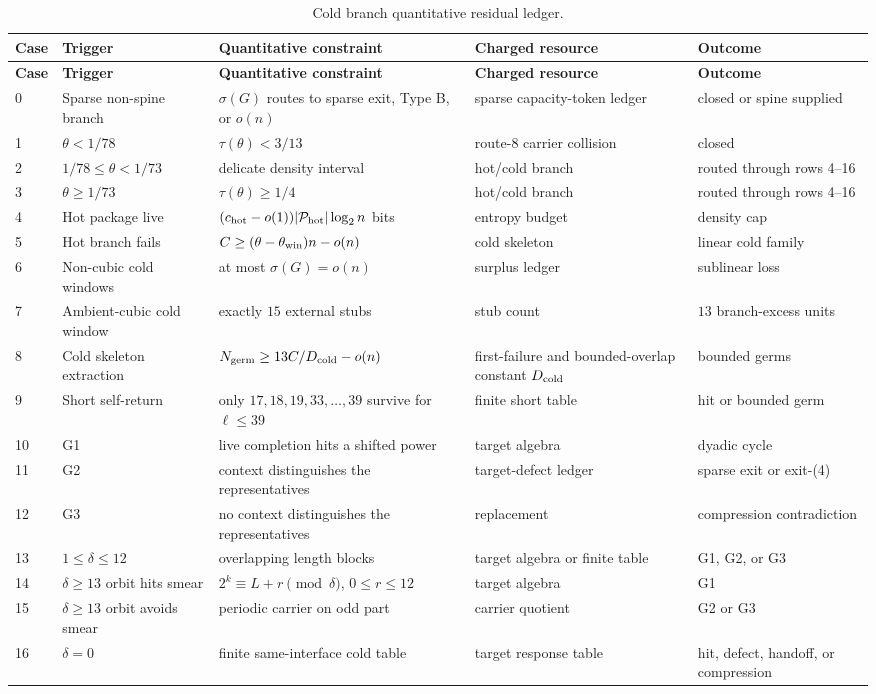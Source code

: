 \documentclass[11pt]{article}
\begin{document}
\begin{longtable}{C{0.05\textwidth} L{0.22\textwidth} L{0.22\textwidth} L{0.20\textwidth} L{0.21\textwidth}}
\caption{Cold branch quantitative residual ledger.}\label{tab:cold-branch-ledger}\\
\toprule
\textbf{Case} & \textbf{Trigger} & \textbf{Quantitative constraint} & \textbf{Charged resource} & \textbf{Outcome} \\
\midrule
\endfirsthead
\toprule
\textbf{Case} & \textbf{Trigger} & \textbf{Quantitative constraint} & \textbf{Charged resource} & \textbf{Outcome} \\
\midrule
{} & Sparse non-spine branch & \(\sigma(G)\) routes to sparse exit, Type B, or \(o(n)\) & sparse capacity-token ledger & closed or spine supplied \\
1 & \(\theta<1/78\) & \(\tau(\theta)<3/13\) & route-8 carrier collision & closed \\
2 & \(1/78\le\theta<1/73\) & delicate density interval & hot/cold branch & routed through rows 4--16 \\
3 & \(\theta\ge1/73\) & \(\tau(\theta)\ge1/4\) & hot/cold branch & routed through rows 4--16 \\
4 & Hot package live & \((c_{\rm hot}-o(1))|\mathcal P_{\rm hot}|\log_2 n\) bits & entropy budget & density cap \\
5 & Hot branch fails & \(C\ge(\theta-\theta_{\rm win})n-o(n)\) & cold skeleton & linear cold family \\
6 & Non-cubic cold windows & at most \(\sigma(G)=o(n)\) & surplus ledger & sublinear loss \\
7 & Ambient-cubic cold window & exactly \(15\) external stubs & stub count & \(13\) branch-excess units \\
8 & Cold skeleton extraction & \(N_{\rm germ}\ge13C/D_{\rm cold}-o(n)\) & first-failure and bounded-overlap constant \(D_{\rm cold}\) & bounded germs \\
9 & Short self-return & only \(17,18,19,33,\ldots,39\) survive for \(\ell\le39\) & finite short table & hit or bounded germ \\
10 & G1 & live completion hits a shifted power & target algebra & dyadic cycle \\
11 & G2 & context distinguishes the representatives & target-defect ledger & sparse exit or exit-\textup{(4)} \\
12 & G3 & no context distinguishes the representatives & replacement & compression contradiction \\
13 & \(1\le\delta\le12\) & overlapping length blocks & target algebra or finite table & G1, G2, or G3 \\
14 & \(\delta\ge13\) orbit hits smear & \(2^k\equiv L+r\pmod\delta\), \(0\le r\le12\) & target algebra & G1 \\
15 & \(\delta\ge13\) orbit avoids smear & periodic carrier on odd part & carrier quotient & G2 or G3 \\
16 & \(\delta=0\) & finite same-interface cold table & target response table & hit, defect, handoff, or compression \\
\bottomrule
\end{longtable}
\end{document}
